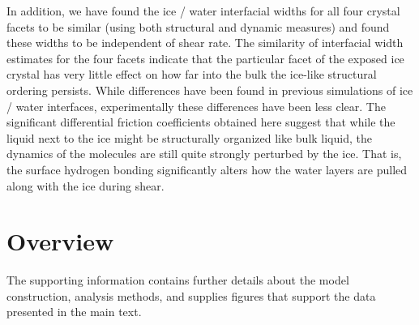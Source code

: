 In addition, we have found the ice / water interfacial widths for all
four crystal facets to be similar (using both structural and dynamic
measures) and found these widths to be independent of shear rate.  The
similarity of interfacial width estimates for the four facets indicate
that the particular facet of the exposed ice crystal has very little
effect on how far into the bulk the ice-like structural ordering
persists. While differences have been found in previous simulations of
ice / water interfaces,\cite{Hayward2001,Hayward2002} experimentally
these differences have been less clear.\cite{Beaglehole1993} The
significant differential friction coefficients obtained here suggest
that while the liquid next to the ice might be structurally organized
like bulk liquid, the dynamics of the molecules are still quite
strongly perturbed by the ice.  That is, the surface hydrogen bonding
significantly alters how the water layers are pulled along with the
ice during shear.



%
%


\section{Overview}
The supporting information contains further details about the model
construction, analysis methods, and supplies figures that support the
data presented in the main text.

